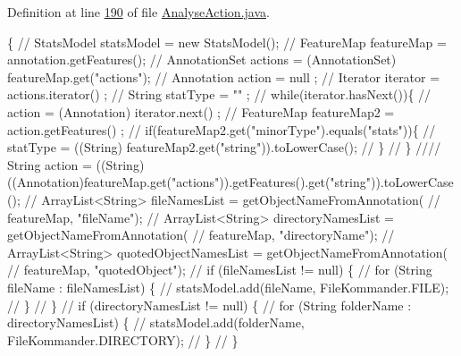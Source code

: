 Definition at line \hyperlink{L190}{190} of file \hyperlink{}{Analyse\-Action.\-java}.


\begin{DoxyCode}
                                                                               
                          \{
\textcolor{comment}{//      StatsModel statsModel = new StatsModel();}
\textcolor{comment}{//        FeatureMap featureMap = annotation.getFeatures();}
\textcolor{comment}{//        AnnotationSet actions = (AnnotationSet) featureMap.get("actions");}
\textcolor{comment}{//        Annotation action  = null ;}
\textcolor{comment}{//        Iterator iterator = actions.iterator() ;}
\textcolor{comment}{//        String statType = "" ; }
\textcolor{comment}{//        while(iterator.hasNext())\{}
\textcolor{comment}{//          action = (Annotation) iterator.next() ; }
\textcolor{comment}{//          FeatureMap featureMap2 = action.getFeatures() ;}
\textcolor{comment}{//          if(featureMap2.get("minorType").equals("stats"))\{}
\textcolor{comment}{//              statType  = ((String) featureMap2.get("string")).toLowerCase();
       }
\textcolor{comment}{//          \}}
\textcolor{comment}{//        \}}\textcolor{comment}{}
\textcolor{comment}{////        String action =
       ((String)((Annotation)featureMap.get("actions")).getFeatures().get("string")).toLowerCase();}
\textcolor{comment}{}\textcolor{comment}{//        ArrayList<String> fileNamesList = getObjectNameFromAnnotation(}
\textcolor{comment}{//                        featureMap, "fileName");}
\textcolor{comment}{//        ArrayList<String> directoryNamesList = getObjectNameFromAnnotation(}
\textcolor{comment}{//                        featureMap, "directoryName");}
\textcolor{comment}{//        ArrayList<String> quotedObjectNamesList =
       getObjectNameFromAnnotation(}
\textcolor{comment}{//                        featureMap, "quotedObject");}
\textcolor{comment}{//        if (fileNamesList != null) \{}
\textcolor{comment}{//                for (String fileName : fileNamesList) \{}
\textcolor{comment}{//                        statsModel.add(fileName, FileKommander.FILE);}
\textcolor{comment}{//                \}}
\textcolor{comment}{//        \}}
\textcolor{comment}{//        if (directoryNamesList != null) \{}
\textcolor{comment}{//                for (String folderName : directoryNamesList) \{}
\textcolor{comment}{//                        statsModel.add(folderName, FileKommander.DIRECTORY);}
\textcolor{comment}{//                \}}
\textcolor{comment}{//        \}}

\end{DoxyCode}
